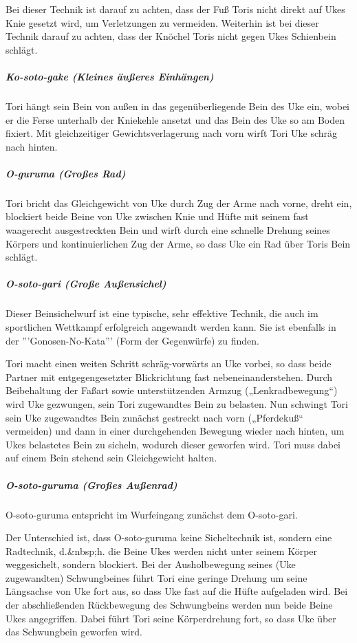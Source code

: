 \documentclass[justified, a4paper, notitlepage, captions=tableheading, nobib]{tufte-handout}
\begin{document}
Bei dieser Technik ist darauf zu achten, dass der Fuß Toris nicht direkt auf Ukes Knie gesetzt wird, um Verletzungen zu vermeiden. Weiterhin ist bei dieser Technik darauf zu achten, dass der Knöchel Toris nicht gegen Ukes Schienbein schlägt.

\subparagraph{Ko-soto-gake (Kleines äußeres Einhängen)}
\label{sec:orga921bb4}
Tori hängt sein Bein von außen in das gegenüberliegende Bein des Uke ein, wobei er die Ferse unterhalb der Kniekehle ansetzt und das Bein des Uke so am Boden fixiert. Mit gleichzeitiger Gewichtsverlagerung nach vorn wirft Tori Uke schräg nach hinten.

\subparagraph{O-guruma (Großes Rad)}
\label{sec:org802a9d1}
Tori bricht das Gleichgewicht von Uke durch Zug der Arme nach vorne, dreht ein, blockiert beide Beine von Uke zwischen Knie und Hüfte mit seinem fast waagerecht ausgestreckten Bein und wirft durch eine schnelle Drehung seines Körpers und kontinuierlichen Zug der Arme, so dass Uke ein Rad über Toris Bein schlägt.

\subparagraph{O-soto-gari (Große Außensichel)}
\label{sec:org8da1fc9}
Dieser Beinsichelwurf ist eine typische, sehr effektive Technik, die auch im sportlichen Wettkampf erfolgreich angewandt werden kann. Sie ist ebenfalls in der '''Gonosen-No-Kata''' (Form der Gegenwürfe) zu finden.

Tori macht einen weiten Schritt schräg-vorwärts an Uke vorbei, so dass beide Partner mit entgegengesetzter Blickrichtung fast nebeneinanderstehen. Durch Beibehaltung der Faßart sowie unterstützenden Armzug („Lenkradbewegung“) wird Uke gezwungen, sein Tori zugewandtes Bein zu belasten. Nun schwingt Tori sein Uke zugewandtes Bein zunächst gestreckt nach vorn („Pferdekuß“ vermeiden) und dann in einer durchgehenden Bewegung wieder nach hinten, um Ukes belastetes Bein zu sicheln, wodurch dieser geworfen wird. Tori muss dabei auf einem Bein stehend sein Gleichgewicht halten.

\subparagraph{O-soto-guruma (Großes Außenrad)}
\label{sec:orgc5c681a}
O-soto-guruma entspricht im Wurfeingang zunächst dem O-soto-gari.

Der Unterschied ist, dass O-soto-guruma keine Sicheltechnik ist, sondern eine Radtechnik, d.\&nbsp;h. die Beine Ukes werden nicht unter seinem Körper weggesichelt, sondern blockiert. Bei der Ausholbewegung seines (Uke zugewandten) Schwungbeines führt Tori eine geringe Drehung um seine Längsachse von Uke fort aus, so dass Uke fast auf die Hüfte aufgeladen wird. Bei der abschließenden Rückbewegung des Schwungbeins werden nun beide Beine Ukes angegriffen. Dabei führt Tori seine Körperdrehung fort, so dass Uke über das Schwungbein geworfen wird.
\end{document}
